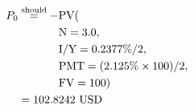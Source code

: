 \begin{align*}
P_{0}&\overset{\text{should}}{=}-\text{PV}(\\
	&\hspace{.5in}\text{N}=3.0,\\
	&\hspace{.5in}\text{I/Y}=0.2377\%/2,\\
	&\hspace{.5in}\text{PMT}=(2.125\%\times 100)/2,\\
	&\hspace{.5in}\text{FV}=100)\\
	&=102.8242\text{ USD}
\end{align*}
